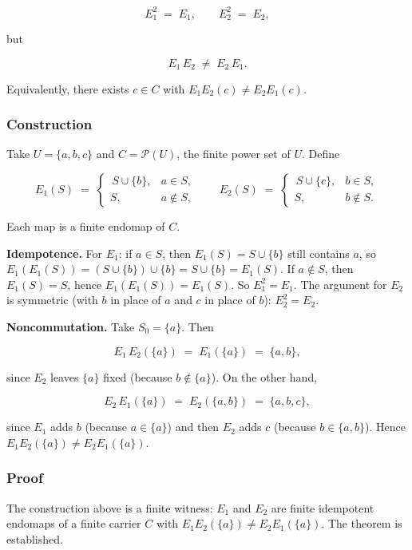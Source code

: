 \documentclass[11pt]{article}
\theoremstyle{definition}
\begin{document}
\[
E_1^2\;=\;E_1,\qquad E_2^2\;=\;E_2,
\]

but

\[
E_1\,E_2\;\neq\;E_2\,E_1.
\]

Equivalently, there exists \(c\in C\) with \(E_1E_2(c)\neq E_2E_1(c)\).

\subsubsection{Construction}

Take \(U=\{a,b,c\}\) and \(C=\mathcal P(U)\), the finite power set of \(U\). Define

\[
E_1(S)\;=\;\begin{cases}\,S\cup\{b\}, & a\in S,\\[2pt] S, & a\notin S,\end{cases}\qquad E_2(S)\;=\;\begin{cases}\,S\cup\{c\}, & b\in S,\\[2pt] S, & b\notin S.\end{cases}
\]

Each map is a finite endomap of \(C\).

\textbf{Idempotence.} For \(E_1\): if \(a\in S\), then \(E_1(S)=S\cup\{b\}\) still contains \(a\), so \(E_1(E_1(S))=(S\cup\{b\})\cup\{b\}=S\cup\{b\}=E_1(S)\). If \(a\notin S\), then \(E_1(S)=S\), hence \(E_1(E_1(S))=E_1(S)\). So \(E_1^2=E_1\). The argument for \(E_2\) is symmetric (with \(b\) in place of \(a\) and \(c\) in place of \(b\)): \(E_2^2=E_2\).

\textbf{Noncommutation.} Take \(S_0=\{a\}\). Then

\[
E_1\,E_2(\{a\})\;=\;E_1(\{a\})\;=\;\{a,b\},
\]

since \(E_2\) leaves \(\{a\}\) fixed (because \(b\notin\{a\}\)). On the other hand,

\[
E_2\,E_1(\{a\})\;=\;E_2(\{a,b\})\;=\;\{a,b,c\},
\]

since \(E_1\) adds \(b\) (because \(a\in\{a\}\)) and then \(E_2\) adds \(c\) (because \(b\in\{a,b\}\)). Hence \(E_1E_2(\{a\})\neq E_2E_1(\{a\})\).

\subsubsection{Proof}

The construction above is a finite witness: \(E_1\) and \(E_2\) are finite idempotent endomaps of a finite carrier \(C\) with \(E_1E_2(\{a\})\neq E_2E_1(\{a\})\). The theorem is established.
\end{document}
